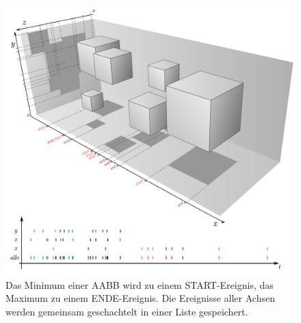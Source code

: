 \begin{figure}\centering
\includegraphics[width=1.0\textwidth]{images/sahnlogn.pdf} 
\caption[Zusammenfassung der Ereignislisten]{Das Minimum einer AABB wird zu einem START-Ereignis, das Maximum zu einem ENDE-Ereignis. Die Ereignisse aller Achsen werden gemeinsam geschachtelt in einer Liste gespeichert.}
\label{fig:eventlist}
\end{figure}

